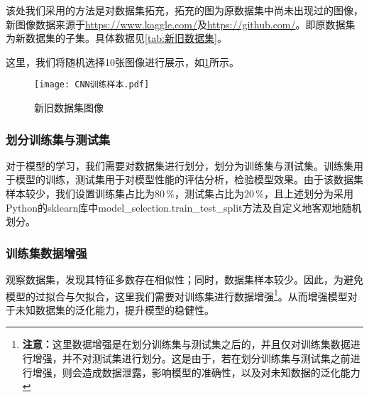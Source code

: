 \documentclass{MathorCupmodeling}
\begin{document}
	该处我们采用的方法是对数据集拓充，拓充的图为原数据集中尚未出现过的图像，新图像数据来源于\url{https://www.kaggle.com/}及\url{https://github.com/}。即原数据集为新数据集的子集。具体数据见\textcolor{blue}{\cref{tab:新旧数据集}}。

\begin{table}[htbp]
	\centering
	\caption{新旧数据集信息}
	\label{tab:新旧数据集}
\end{table}
	这里，我们将随机选择10张图像进行展示，如\textcolor{blue}{\cref{fig:新旧数据集图像}}所示。
	\begin{figure}[H]
		\centering
		\texttt{[image: CNN训练样本.pdf]}
		\caption{新旧数据集图像}
		\label{fig:新旧数据集图像}
	\end{figure}
	\subsubsection{划分训练集与测试集}
	对于模型的学习，我们需要对数据集进行划分，划分为训练集与测试集。训练集用于模型的训练，测试集用于对模型性能的评估分析，检验模型效果。由于该数据集样本较少，我们设置训练集占比为$80\,\%$，测试集占比为$20\,\%$，且上述划分为采用Python的sklearn库中model\_selection.train\_test\_split方法及自定义地客观地随机划分。

	\subsubsection{训练集数据增强}
	观察数据集，发现其特征多数存在相似性；同时，数据集样本较少。因此，为避免模型的过拟合与欠拟合，这里我们需要对训练集进行数据增强\textcolor{blue}{\footnote{\textbf{注意：}这里数据增强是在划分训练集与测试集之后的，并且仅对训练集数据进行增强，并不对测试集进行划分。这是由于，若在划分训练集与测试集之前进行增强，则会造成数据泄露，影响模型的准确性，以及对未知数据的泛化能力}}。从而增强模型对于未知数据集的泛化能力，提升模型的稳健性。
\end{document}
